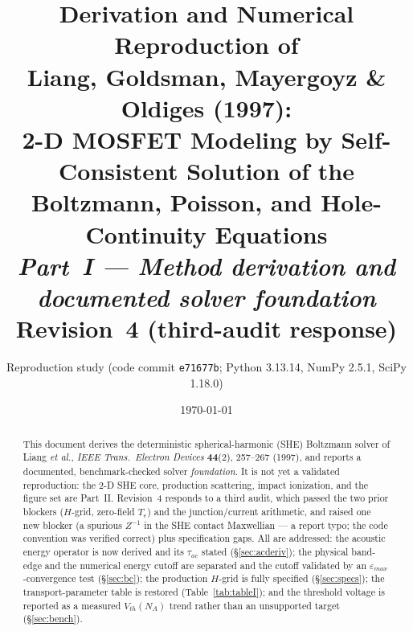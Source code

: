 \documentclass[11pt]{article}
\title{\textbf{Derivation and Numerical Reproduction of\\
Liang, Goldsman, Mayergoyz \& Oldiges (1997):\\
2-D MOSFET Modeling by Self-Consistent Solution of the\\
Boltzmann, Poisson, and Hole-Continuity Equations}\\[4pt]
\large\textit{Part~I --- Method derivation and documented solver foundation}\\
\normalsize\textbf{Revision~4} (third-audit response)}
\author{Reproduction study \quad\small(code commit \texttt{e71677b}; Python 3.13.14, NumPy 2.5.1, SciPy 1.18.0)}
\date{\today}
\newcommand{\eps}{\varepsilon}
\begin{document}
\maketitle

\begin{abstract}
\noindent
This document derives the deterministic spherical-harmonic (SHE) Boltzmann solver of Liang
\emph{et al.}, \emph{IEEE Trans.\ Electron Devices} \textbf{44}(2), 257--267 (1997), and
reports a documented, benchmark-checked solver \emph{foundation}. It is not yet a validated
reproduction: the 2-D SHE core, production scattering, impact ionization, and the figure set
are Part~II. Revision~4 responds to a third audit, which passed the two prior blockers
($H$-grid, zero-field $T_e$) and the junction/current arithmetic, and raised one new blocker
(a spurious $Z^{-1}$ in the SHE contact Maxwellian --- a report typo; the code convention was
verified correct) plus specification gaps. All are addressed: the acoustic energy operator is
now derived and its $\tau_{ac}$ stated (\S\ref{sec:acderiv}); the physical band-edge and the
numerical energy cutoff are separated and the cutoff validated by an $\eps_{max}$-convergence
test (\S\ref{sec:bc}); the production $H$-grid is fully specified (\S\ref{sec:specs}); the
transport-parameter table is restored (Table~\ref{tab:tableI}); and the threshold voltage is
reported as a measured $V_{th}(N_A)$ trend rather than an unsupported target
(\S\ref{sec:bench}).
\end{abstract}

\tableofcontents
\end{document}
